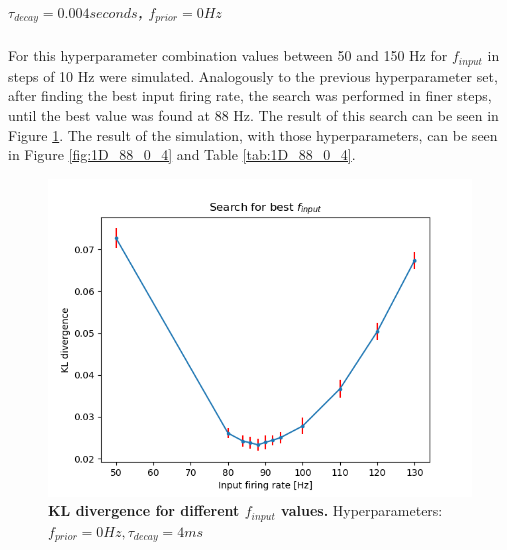 \subparagraph{$\tau_{decay} = 0.004 seconds$, $f_{prior} = 0 Hz$}
For this hyperparameter combination values between 50 and 150 Hz for $f_{input}$ in steps of 10 Hz were simulated. Analogously to the previous hyperparameter set, after finding the best input firing rate, the search was performed in finer steps, until the best value was found at 88 Hz. The result of this search can be seen in Figure \ref{fig:1D_KLD_fPrior0_tau4}. The result of the simulation, with those hyperparameters, can be seen in Figure \ref{fig:1D_88_0_4} and Table \ref{tab:1D_88_0_4}.

\begin{figure}
\centering
  \includegraphics[width=0.75\linewidth]{figures/1D/KLDvsfInput_fPrior0tau4.png}
  \caption{\textbf{KL divergence for different $f_{input}$ values.} Hyperparameters: $f_{prior} = 0 Hz, \tau_{decay} = 4 ms$}
  \label{fig:1D_KLD_fPrior0_tau4}
\end{figure}

